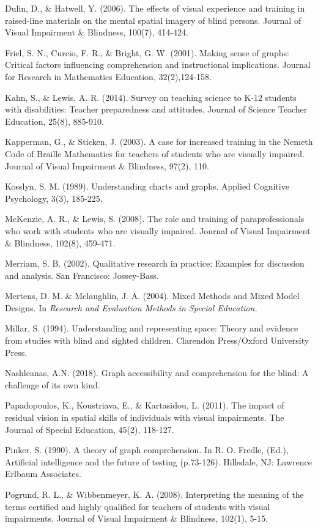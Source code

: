 \documentclass[11.5pt]{sig-alternate} %
\begin{document}
Dulin, D., \& Hatwell, Y. (2006). The effects of visual experience and training in raised-line materials on the mental spatial imagery of blind persons. Journal of Visual Impairment \& Blindness, 100(7), 414-424.

Friel, S. N., Curcio, F. R., \& Bright, G. W. (2001). Making sense of graphs: Critical factors influencing comprehension and instructional implications. Journal for Research in Mathematics Education, 32(2),124-158.

Kahn, S., \& Lewis, A. R. (2014). Survey on teaching science to K-12 students with disabilities: Teacher preparedness and attitudes. Journal of Science Teacher Education, 25(8), 885-910.

Kapperman, G., \& Sticken, J. (2003). A case for increased training in the Nemeth Code of Braille Mathematics for teachers of students who are visually impaired. Journal of Visual Impairment \& Blindness, 97(2), 110.

Kosslyn, S. M. (1989). Understanding charts and graphs. Applied Cognitive Psychology, 3(3), 185-225.

McKenzie, A. R., \& Lewis, S. (2008). The role and training of paraprofessionals who work with students who are visually impaired. Journal of Visual Impairment \& Blindness, 102(8), 459-471.

Merriam, S. B. (2002). Qualitative research in practice: Examples for discussion and analysis. San Francisco: Jossey-Bass.

Mertens, D. M. \& Mclaughlin, J. A. (2004). Mixed Methods and Mixed Model Designs. In \textit{Research and Evaluation Methods in Special Education.}

Millar, S. (1994). Understanding and representing space: Theory and evidence from studies with blind and sighted children. Clarendon Press/Oxford University Press.

Nashleanas, A.N. (2018). Graph accessibility and comprehension for the blind: A challenge of its own kind.

Papadopoulos, K., Koustriava, E., \& Kartasidou, L. (2011). The impact of residual vision in spatial skills of individuals with visual impairments. The Journal of Special Education, 45(2), 118-127. 

Pinker, S. (1990). A theory of graph comprehension. In R. O. Fredle, (Ed.), Artificial intelligence and the future of testing (p.73-126). Hillsdale, NJ: Lawrence Erlbaum Associates.

Pogrund, R. L., \& Wibbenmeyer, K. A. (2008). Interpreting the meaning of the terms certified and highly qualified for teachers of students with visual impairments. Journal of Visual Impairment \& Blindness, 102(1), 5-15.
\end{document}
